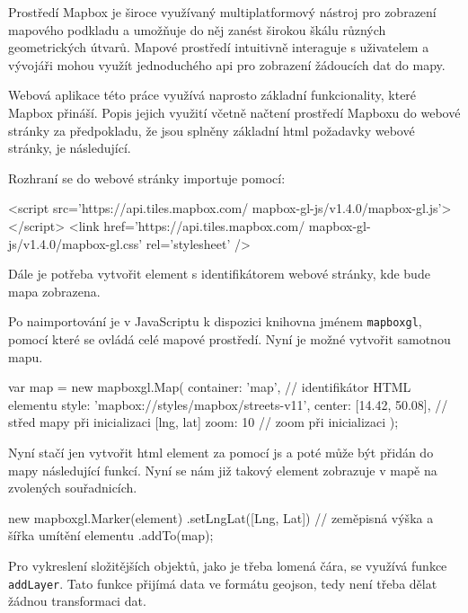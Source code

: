 \bigbreak


Prostředí Mapbox je široce využívaný multiplatformový nástroj pro zobrazení mapového podkladu a umožňuje do něj zanést širokou škálu různých geometrických útvarů. Mapové prostředí intuitivně interaguje s uživatelem a vývojáři mohou využít jednoduchého \gls{api} pro zobrazení žádoucích dat do mapy.


\bigbreak


Webová aplikace této práce využívá naprosto základní funkcionality, které Mapbox přináší. Popis jejich využití včetně načtení prostředí Mapboxu do webové stránky za předpokladu, že jsou splněny základní \gls{html} požadavky webové stránky, je následující.


\bigbreak


Rozhraní se do webové stránky importuje pomocí:


\begin{code}[frame=none]
<script src='https://api.tiles.mapbox.com/
  mapbox-gl-js/v1.4.0/mapbox-gl.js'></script>
<link href='https://api.tiles.mapbox.com/
  mapbox-gl-js/v1.4.0/mapbox-gl.css' rel='stylesheet' />
\end{code}


\bigbreak


Dále je potřeba vytvořit element s identifikátorem webové stránky, kde bude mapa zobrazena.


\bigbreak


Po naimportování je v JavaScriptu k dispozici knihovna jménem \verb-mapboxgl-, pomocí které se ovládá celé mapové prostředí. Nyní je možné vytvořit samotnou mapu.


\begin{code}[frame=none]
var map = new mapboxgl.Map({
  container: 'map', // identifikátor HTML elementu
  style: 'mapbox://styles/mapbox/streets-v11',
  center: [14.42, 50.08], // střed mapy při inicializaci [lng, lat]
    zoom: 10 // zoom při inicializaci
});
\end{code}


Nyní stačí jen vytvořit \gls{html} element za pomocí \gls{js} a poté může být přidán do mapy následující funkcí. Nyní se nám již takový element zobrazuje v mapě na zvolených souřadnicích.


\begin{code}[frame=none]
new mapboxgl.Marker(element)
  .setLngLat([Lng, Lat]) // zeměpisná výška a šířka
    umítění elementu
  .addTo(map);
\end{code}


Pro vykreslení složitějších objektů, jako je třeba lomená čára, se využívá funkce \verb-addLayer-. Tato funkce přijímá data ve formátu \gls{geojson}, tedy není třeba dělat žádnou transformaci dat.


